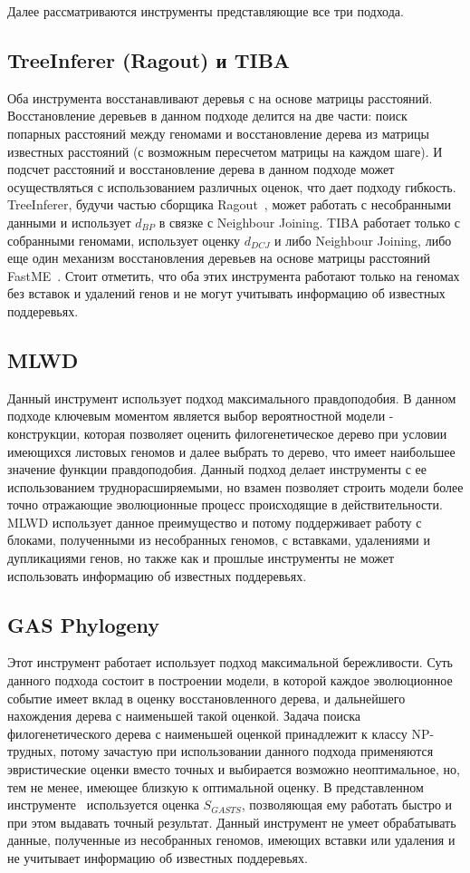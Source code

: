 Далее рассматриваются инструменты представляющие все три подхода.

\subsection{TreeInferer (Ragout) и TIBA}
Оба инструмента восстанавливают деревья с на основе матрицы расстояний.
Восстановление деревьев в данном подходе делится на две части:
поиск попарных расстояний между геномами и восстановление дерева из матрицы известных расстояний
(с возможным пересчетом матрицы на каждом шаге).
И подсчет расстояний и восстановление дерева в данном подходе может осуществляться с использованием различных оценок, что дает подходу гибкость.
TreeInferer, будучи частью сборщика Ragout~\cite{Kolmogorov2014}, может работать с несобранными данными
и использует $d_{BP}$ в связке с Neighbour Joining.
TIBA работает только с собранными геномами, использует оценку $d_{DCJ}$
и либо Neighbour Joining, либо еще один механизм восстановления деревьев на основе матрицы расстояний FastME~\cite{desper2002fast}.
Стоит отметить, что оба этих инструмента работают только на геномах без вставок и удалений генов
и не могут учитывать информацию об известных поддеревьях.

\subsection{MLWD}
Данный инструмент использует подход максимального правдоподобия.
В данном подходе ключевым моментом является выбор вероятностной модели - конструкции,
которая позволяет оценить филогенетическое дерево при условии имеющихся листовых геномов
и далее выбрать то дерево, что имеет наибольшее значение функции правдоподобия.
Данный подход делает инструменты с ее использованием труднорасширяемыми,
но взамен позволяет строить модели более точно отражающие эволюционные процесс происходящие в действительности.
MLWD использует данное преимущество и потому поддерживает работу с блоками, полученными из несобранных геномов,
с вставками, удалениями и дупликациями генов, но также как
и прошлые инструменты не может использовать информацию об известных поддеревьях.

\subsection{GAS Phylogeny}
Этот инструмент работает использует подход максимальной бережливости.
Суть данного подхода состоит в построении модели,
в которой каждое эволюционное событие имеет вклад в оценку восстановленного дерева, и дальнейшего нахождения дерева с наименьшей такой оценкой.
Задача поиска филогенетического дерева с наименьшей оценкой принадлежит к классу NP-трудных, потому зачастую при использовании данного подхода
применяются эвристические оценки вместо точных и выбирается возможно неоптимальное, но, тем не менее, имеющее близкую к оптимальной оценку.
В представленном инструменте~\cite{xu2011gasts} используется оценка $S_{GASTS}$, позволяющая ему работать быстро и при этом выдавать точный результат.
Данный инструмент не умеет обрабатывать данные, полученные из несобранных геномов, имеющих вставки или удаления и не учитывает информацию об
известных поддеревьях.

